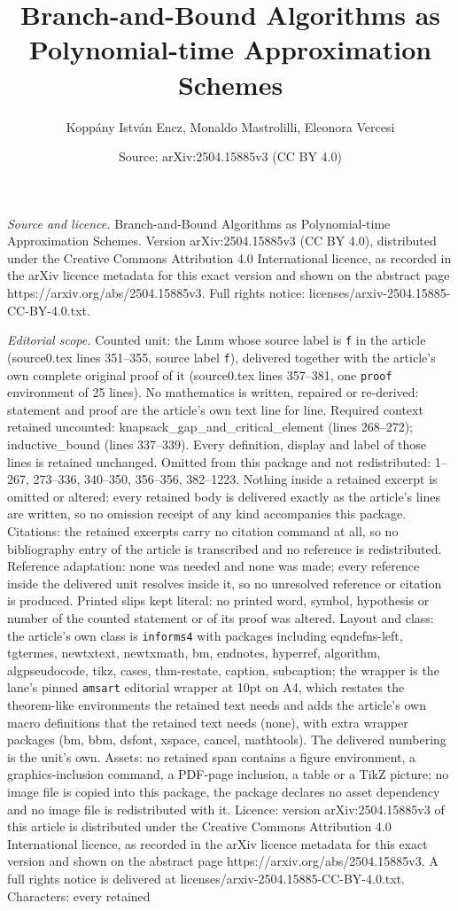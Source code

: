 \documentclass[10pt,a4paper]{amsart}
\title[Branch-and-Bound Algorithms as Polynomial-time Approximation]{Branch-and-Bound Algorithms as Polynomial-time Approximation Schemes}
\author{Kopp\'any Istv\'an Encz, Monaldo Mastrolilli, Eleonora Vercesi}
\date{Source: arXiv:2504.15885v3 (CC BY 4.0)}
\begin{document}
\maketitle

\noindent\emph{Source and licence.} Branch-and-Bound Algorithms as Polynomial-time Approximation Schemes. Version arXiv:2504.15885v3 (CC BY 4.0), distributed under the Creative Commons Attribution 4.0 International licence, as recorded in the arXiv licence metadata for this exact version and shown on the abstract page https://arxiv.org/abs/2504.15885v3. Full rights notice: licenses/arxiv-2504.15885-CC-BY-4.0.txt.\par\smallskip

\noindent\textit{Editorial scope.} Counted unit: the Lmm whose source label is \texttt{f} in the article (source0.tex lines 351--355, source label \texttt{f}), delivered together with the article's own complete original proof of it (source0.tex lines 357--381, one \texttt{proof} environment of 25 lines). No mathematics is written, repaired or re-derived: statement and proof are the article's own text line for line. Required context retained uncounted: knapsack\_gap\_and\_critical\_element (lines 268--272); inductive\_bound (lines 337--339). Every definition, display and label of those lines is retained unchanged. Omitted from this package and not redistributed: 1--267, 273--336, 340--350, 356--356, 382--1223. Nothing inside a retained excerpt is omitted or altered: every retained body is delivered exactly as the article's lines are written, so no omission receipt of any kind accompanies this package. Citations: the retained excerpts carry no citation command at all, so no bibliography entry of the article is transcribed and no reference is redistributed. Reference adaptation: none was needed and none was made; every reference inside the delivered unit resolves inside it, so no unresolved reference or citation is produced. Printed slips kept literal: no printed word, symbol, hypothesis or number of the counted statement or of its proof was altered. Layout and class: the article's own class is \texttt{informs4} with packages including eqndefns-left, tgtermes, newtxtext, newtxmath, bm, endnotes, hyperref, algorithm, algpseudocode, tikz, cases, thm-restate, caption, subcaption; the wrapper is the lane's pinned \texttt{amsart} editorial wrapper at 10pt on A4, which restates the theorem-like environments the retained text needs and adds the article's own macro definitions that the retained text needs (none), with extra wrapper packages (bm, bbm, dsfont, xspace, cancel, mathtools). The delivered numbering is the unit's own. Assets: no retained span contains a figure environment, a graphics-inclusion command, a PDF-page inclusion, a table or a TikZ picture; no image file is copied into this package, the package declares no asset dependency and no image file is redistributed with it. Licence: version arXiv:2504.15885v3 of this article is distributed under the Creative Commons Attribution 4.0 International licence, as recorded in the arXiv licence metadata for this exact version and shown on the abstract page https://arxiv.org/abs/2504.15885v3. A full rights notice is delivered at licenses/arxiv-2504.15885-CC-BY-4.0.txt. Characters: every retained 
\end{document}
